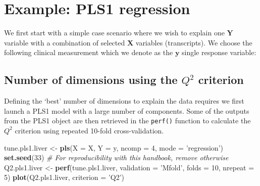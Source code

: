 \documentclass[]{book}
\newenvironment{Shaded}{\begin{snugshade}}{\end{snugshade}}
\newcommand{\KeywordTok}[1]{\textcolor[rgb]{0.13,0.29,0.53}{\textbf{#1}}}
\newcommand{\DataTypeTok}[1]{\textcolor[rgb]{0.13,0.29,0.53}{#1}}
\newcommand{\DecValTok}[1]{\textcolor[rgb]{0.00,0.00,0.81}{#1}}
\newcommand{\StringTok}[1]{\textcolor[rgb]{0.31,0.60,0.02}{#1}}
\newcommand{\CommentTok}[1]{\textcolor[rgb]{0.56,0.35,0.01}{\textit{#1}}}
\newcommand{\OperatorTok}[1]{\textcolor[rgb]{0.81,0.36,0.00}{\textbf{#1}}}
\newcommand{\NormalTok}[1]{#1}
\begin{document}
\section{Example: PLS1 regression}\label{example-pls1-regression}

We first start with a simple case scenario where we wish to explain one
\(\boldsymbol Y\) variable with a combination of selected
\(\boldsymbol X\) variables (transcripts). We choose the following
clinical measurement which we denote as the \(\boldsymbol y\) single
response variable:

\begin{Shaded}
\end{Shaded}

\subsection{\texorpdfstring{Number of dimensions using the \(Q^2\)
criterion}{Number of dimensions using the Q\^{}2 criterion}}\label{number-of-dimensions-using-the-q2-criterion}

Defining the `best' number of dimensions to explain the data requires we
first launch a PLS1 model with a large number of components. Some of the
outputs from the PLS1 object are then retrieved in the \texttt{perf()}
function to calculate the \(Q^2\) criterion using repeated 10-fold
cross-validation.

\begin{Shaded}
\begin{Highlighting}[]
\NormalTok{tune.pls1.liver <-}\StringTok{ }\KeywordTok{pls}\NormalTok{(}\DataTypeTok{X =}\NormalTok{ X, }\DataTypeTok{Y =}\NormalTok{ y, }\DataTypeTok{ncomp =} \DecValTok{4}\NormalTok{, }\DataTypeTok{mode =} \StringTok{'regression'}\NormalTok{)}
\KeywordTok{set.seed}\NormalTok{(}\DecValTok{33}\NormalTok{)  }\CommentTok{# For reproducibility with this handbook, remove otherwise}
\NormalTok{Q2.pls1.liver <-}\StringTok{ }\KeywordTok{perf}\NormalTok{(tune.pls1.liver, }\DataTypeTok{validation =} \StringTok{'Mfold'}\NormalTok{, }
                      \DataTypeTok{folds =} \DecValTok{10}\NormalTok{, }\DataTypeTok{nrepeat =} \DecValTok{5}\NormalTok{)}
\KeywordTok{plot}\NormalTok{(Q2.pls1.liver, }\DataTypeTok{criterion =} \StringTok{'Q2'}\NormalTok{)}
\end{Highlighting}
\end{Shaded}
\end{document}
